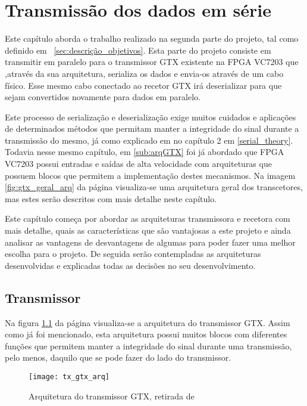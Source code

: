\chapter{Transmissão dos dados em série}\label{chap:chap4}

Este capítulo aborda o trabalho realizado na segunda parte do projeto, tal como definido em ~\ref{sec:descrição_objetivos}. Esta parte do projeto consiste em transmitir em paralelo para o transmissor GTX existente na FPGA VC7203 que ,através da sua arquitetura, serializa os dados e envia-os através de um cabo físico. Esse mesmo cabo conectado ao recetor GTX irá deserializar para que sejam convertidos novamente para dados em paralelo.

Este processo de serialização e deserialização exige muitos cuidados e aplicações de determinados métodos que permitam manter a integridade do sinal durante a transmissão do mesmo, já como explicado em no capítulo 2 em \ref{serial_theory}. Todavia nesse mesmo capítulo, em \ref{sub:arqGTX} foi já abordado que FPGA VC7203 possui entradas e saídas de alta velocidade com arquiteturas que possuem blocos que permitem a implementação destes mecanismos. Na imagem \ref{fig:gtx_geral_arq} da página \pageref{fig:gtx_geral_arq} visualiza-se uma arquitetura geral dos transcetores, mas estes serão descritos com mais detalhe neste capítulo.

Este capítulo começa por abordar as arquiteturas transmissora e recetora com mais detalhe, quais as características que são vantajosas a este projeto e ainda analisar as vantagens de desvantagens de algumas para poder fazer uma melhor escolha para o projeto. De seguida serão contempladas as arquiteturas desenvolvidas e explicadas todas as decisões no seu desenvolvimento.

\section{Transmissor} \label{sec:tx_gtx}

Na figura \ref{fig:gtx_tx_arq} da página \pageref{fig:gtx_tx_arq} visualiza-se a arquitetura do transmissor GTX. Assim como já foi mencionado, esta arquitetura possui muitos blocos com diferentes funções que permitem manter a integridade do sinal durante uma transmissão, pelo menos, daquilo que se pode fazer do lado do transmissor.
\begin{figure}[h!]
	\begin{center}
		\leavevmode
		\texttt{[image: tx\_gtx\_arq]}
		\caption{Arquitetura do transmissor GTX, retirada de \cite{R011}}
		\label{fig:gtx_tx_arq}
	\end{center}
\end{figure}

